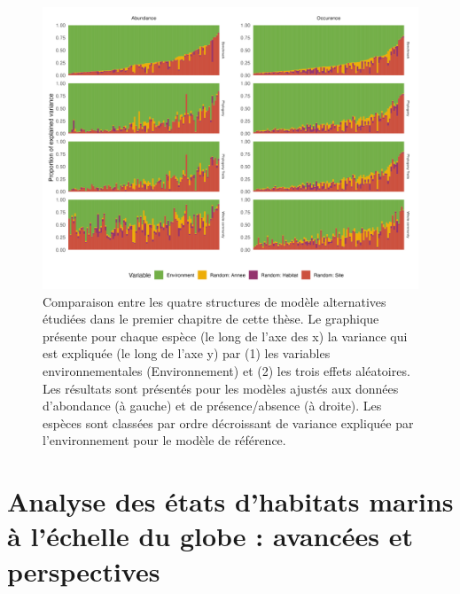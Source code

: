 \begin{refsection}
\begin{figure}
\hypertarget{fig:disccusion1}{%
\centering
\includegraphics{04-Conclusion/figures/habitat_hmsc_random_effect.png}
\caption{Comparaison entre les quatre structures de modèle alternatives
étudiées dans le premier chapitre de cette thèse. Le graphique présente
pour chaque espèce (le long de l'axe des x) la variance qui est
expliquée (le long de l'axe y) par (1) les variables environnementales
(Environnement) et (2) les trois effets aléatoires. Les résultats sont
présentés pour les modèles ajustés aux données d'abondance (à gauche) et
de présence/absence (à droite). Les espèces sont classées par ordre
décroissant de variance expliquée par l'environnement pour le modèle de
référence.}\label{fig:disccusion1}
}
\end{figure}

\clearpage

\hypertarget{analyse-des-uxe9tats-dhabitats-marins-uxe0-luxe9chelle-du-globe-avancuxe9es-et-perspectives}{%
\section{Analyse des états d'habitats marins à l'échelle du globe :
avancées et
perspectives}\label{analyse-des-uxe9tats-dhabitats-marins-uxe0-luxe9chelle-du-globe-avancuxe9es-et-perspectives}}


\end{refsection}
